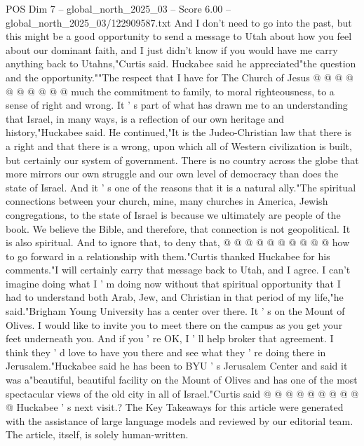 \begin{textsample}{POS Dim 7 – global\_north\_2025\_03 – Score 6.00 – global\_north\_2025\_03/122909587.txt}
And I don't need to go into the past, but this might be a good opportunity to send a message to Utah about how you feel about our dominant faith, and I just didn't know if you would have me carry anything back to Utahns,"Curtis said.
Huckabee said he appreciated"the question and the opportunity.""The respect that I have for The Church of Jesus @ @ @ @ @ @ @ @ @ @ much the commitment to family, to moral righteousness, to a sense of right and wrong.
It ' s part of what has drawn me to an understanding that Israel, in many ways, is a reflection of our own heritage and history,"Huckabee said.
He continued,"It is the Judeo-Christian law that there is a right and that there is a wrong, upon which all of Western civilization is built, but certainly our system of government.
There is no country across the globe that more mirrors our own struggle and our own level of democracy than does the state of Israel.
And it ' s one of the reasons that it is a natural ally."The spiritual connections between your church, mine, many churches in America, Jewish congregations, to the state of Israel is because we ultimately are people of the book.
We believe the Bible, and therefore, that connection is not geopolitical.
It is also spiritual.
And to ignore that, to deny that, @ @ @ @ @ @ @ @ @ @ how to go forward in a relationship with them."Curtis thanked Huckabee for his comments."I will certainly carry that message back to Utah, and I agree.
I can't imagine doing what I ' m doing now without that spiritual opportunity that I had to understand both Arab, Jew, and Christian in that period of my life,"he said."Brigham Young University has a center over there.
It ' s on the Mount of Olives.
I would like to invite you to meet there on the campus as you get your feet underneath you.
And if you ' re OK, I ' ll help broker that agreement.
I think they ' d love to have you there and see what they ' re doing there in Jerusalem."Huckabee said he has been to BYU ' s Jerusalem Center and said it was a"beautiful, beautiful facility on the Mount of Olives and has one of the most spectacular views of the old city in all of Israel."Curtis said @ @ @ @ @ @ @ @ @ @ Huckabee ' s next visit.?
The Key Takeaways for this article were generated with the assistance of large language models and reviewed by our editorial team.
The article, itself, is solely human-written.

\end{textsample}
